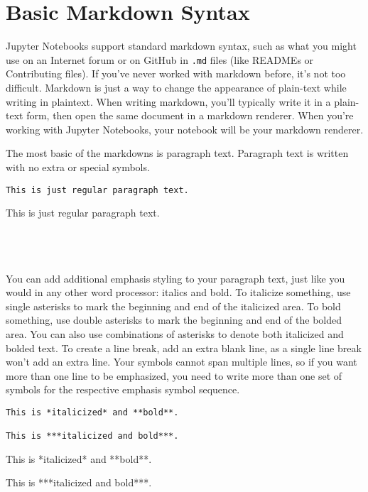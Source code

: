 \section{Basic Markdown Syntax}
Jupyter Notebooks support standard markdown syntax, such as what you might use on an Internet forum or on GitHub in \verb|.md| files (like READMEs or Contributing files). If you've never worked with markdown before, it's not too difficult. Markdown is just a way to change the appearance of plain-text while writing in plaintext. When writing markdown, you'll typically write it in a plain-text form, then open the same document in a markdown renderer. When you're working with Jupyter Notebooks, your notebook will be your markdown renderer.\par
The most basic of the markdowns is paragraph text. Paragraph text is written with no extra or special symbols.
\begin{lstlisting}
This is just regular paragraph text.
\end{lstlisting}
\begin{markdown}
This is just regular paragraph text.
\end{markdown}\\
\\
\\
You can add additional emphasis styling to your paragraph text, just like you would in any other word processor: italics and bold. To italicize something, use single asterisks to mark the beginning and end of the italicized area. To bold something, use double asterisks to mark the beginning and end of the bolded area. You can also use combinations of asterisks to denote both italicized and bolded text. To create a line break, add an extra blank line, as a single line break won't add an extra line. Your symbols cannot span multiple lines, so if you want more than one line to be emphasized, you need to write more than one set of symbols for the respective emphasis symbol sequence.\par
\begin{lstlisting}
This is *italicized* and **bold**.

This is ***italicized and bold***.
\end{lstlisting}
\par
\begin{markdown}
This is *italicized* and **bold**.

This is ***italicized and bold***.
\end{markdown}\\
\\
